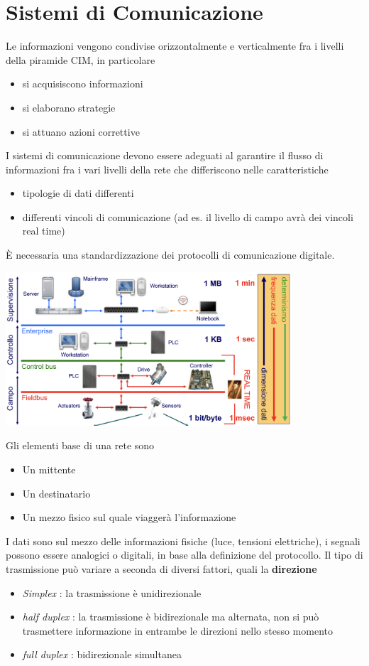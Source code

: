 \documentclass[10pt, letterpaper]{report}
\begin{document}
\section{Sistemi di Comunicazione}
Le informazioni vengono condivise orizzontalmente e verticalmente 
fra i livelli della piramide CIM, in particolare\begin{itemize}
    \item si acquisiscono informazioni 
    \item si elaborano strategie 
    \item si attuano azioni correttive
\end{itemize}
I sistemi di comunicazione devono essere adeguati 
al garantire il flusso di informazioni fra i vari livelli della 
rete che differiscono nelle caratteristiche\begin{itemize}
    \item tipologie di dati differenti 
    \item differenti vincoli di comunicazione (ad es. il livello di campo 
    avrà dei vincoli real time)
\end{itemize}
È necessaria una standardizzazione dei protocolli di comunicazione digitale.
\begin{center}
    \includegraphics[width=0.8\textwidth ]{images/reti.png}
\end{center}
Gli elementi base di una rete sono \begin{itemize}
    \item Un mittente 
    \item Un destinatario 
    \item Un mezzo fisico sul quale viaggerà l'informazione 
\end{itemize}
I dati sono sul mezzo delle informazioni fisiche (luce, tensioni 
elettriche), i segnali possono essere analogici o digitali, 
in base alla definizione del protocollo. Il tipo di 
trasmissione può variare a seconda di diversi fattori, 
quali la \textbf{direzione}\begin{itemize}
    \item \textit{Simplex} : la trasmissione è unidirezionale 
    \item \textit{half duplex} : la trasmissione è bidirezionale ma 
    alternata, non si può trasmettere informazione in entrambe le direzioni 
    nello stesso momento
    \item \textit{full duplex} : bidirezionale simultanea 
\end{itemize}
\end{document}
